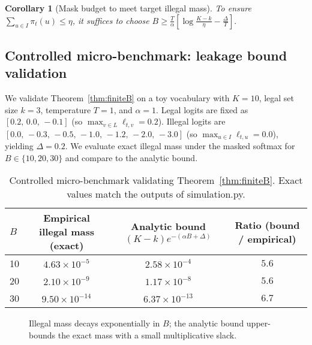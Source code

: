 \documentclass{article}
\newtheorem{corollary}{Corollary}
\begin{document}
\begin{corollary}[Mask budget to meet target illegal mass]\label{cor:budget}
To ensure $\sum_{u\in I}\pi_t(u)\le \eta$, it suffices to choose
$B \ge \frac{T}{\alpha}\left[\log\frac{K-k}{\eta}-\frac{\Delta}{T}\right].$
\end{corollary}

\subsection{Controlled micro-benchmark: leakage bound validation}\label{sec:microbench}
We validate Theorem~\ref{thm:finiteB} on a toy vocabulary with $K=10$, legal set size $k=3$, temperature $T=1$, and $\alpha=1$. Legal logits are fixed as $[0.2,\,0.0,\,-0.1]$ (so $\max_{v\in L}\ell_{t,v}=0.2$). Illegal logits are $[0.0,\,-0.3,\,-0.5,\,-1.0,\,-1.2,\,-2.0,\,-3.0]$ (so $\max_{u\in I}\ell_{t,u}=0.0$), yielding $\Delta=0.2$. We evaluate exact illegal mass under the masked softmax for $B\in\{10,20,30\}$ and compare to the analytic bound.

\begin{table}[h]
\centering
\small
\begin{tabular}{@{}lccc@{}}
\toprule
$B$ & Empirical illegal mass (exact) & Analytic bound $(K-k)e^{-(\alpha B+\Delta)}$ & Ratio (bound / empirical) \\
\midrule
10 & $4.63\times10^{-5}$ & $2.58\times10^{-4}$ & $5.6$ \\
20 & $2.10\times10^{-9}$ & $1.17\times10^{-8}$ & $5.6$ \\
30 & $9.50\times10^{-14}$ & $6.37\times10^{-13}$ & $6.7$ \\
\bottomrule
\end{tabular}
\caption{Controlled micro-benchmark validating Theorem~\ref{thm:finiteB}. Exact values match the outputs of simulation.py.}
\label{tab:microbench}
\end{table}

\begin{figure}[h]
\centering
{}
\caption{Illegal mass decays exponentially in $B$; the analytic bound upper-bounds the exact mass with a small multiplicative slack.}
\label{fig:leakage_plot}
\end{figure}
\end{document}
